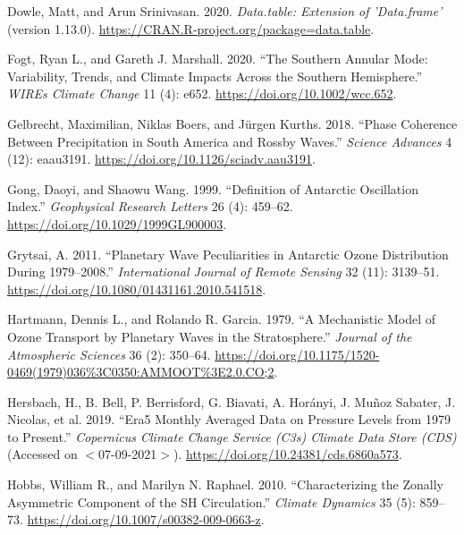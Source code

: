 \documentclass[smallextended]{svjour3}       %
\newlength{\cslhangindent}
\newlength{\cslentryspacingunit} %
\newenvironment{CSLReferences}[2] %
 {%
  \setlength{\parindent}{0pt}
  \ifodd #1
  \let\oldpar\par
  \def\par{\hangindent=\cslhangindent\oldpar}
  \fi
  \setlength{\parskip}{#2\cslentryspacingunit}
 }%
 {}
\begin{document}
\begin{CSLReferences}{1}{0}
\leavevmode{}%
Dowle, Matt, and Arun Srinivasan. 2020. \emph{Data.table: {Extension} of 'Data.frame'} (version 1.13.0). \url{https://CRAN.R-project.org/package=data.table}.

\leavevmode{}%
Fogt, Ryan L., and Gareth J. Marshall. 2020. {``The {Southern Annular Mode}: {Variability}, Trends, and Climate Impacts Across the {Southern Hemisphere}.''} \emph{WIREs Climate Change} 11 (4): e652. \url{https://doi.org/10.1002/wcc.652}.

\leavevmode{}%
Gelbrecht, Maximilian, Niklas Boers, and Jürgen Kurths. 2018. {``Phase Coherence Between Precipitation in {South America} and {Rossby} Waves.''} \emph{Science Advances} 4 (12): eaau3191. \url{https://doi.org/10.1126/sciadv.aau3191}.

\leavevmode{}%
Gong, Daoyi, and Shaowu Wang. 1999. {``Definition of {Antarctic Oscillation} Index.''} \emph{Geophysical Research Letters} 26 (4): 459--62. \url{https://doi.org/10.1029/1999GL900003}.

\leavevmode{}%
Grytsai, A. 2011. {``Planetary Wave Peculiarities in {Antarctic} Ozone Distribution During 1979--2008.''} \emph{International Journal of Remote Sensing} 32 (11): 3139--51. \url{https://doi.org/10.1080/01431161.2010.541518}.

\leavevmode{}%
Hartmann, Dennis L., and Rolando R. Garcia. 1979. {``A {Mechanistic Model} of {Ozone Transport} by {Planetary Waves} in the {Stratosphere}.''} \emph{Journal of the Atmospheric Sciences} 36 (2): 350--64. \url{https://doi.org/10.1175/1520-0469(1979)036\%3C0350:AMMOOT\%3E2.0.CO;2}.

\leavevmode{}%
Hersbach, H., B. Bell, P. Berrisford, G. Biavati, A. Horányi, J. Muñoz Sabater, J. Nicolas, et al. 2019. {``{Era5} Monthly Averaged Data on Pressure Levels from 1979 to Present.''} \emph{{Copernicus Climate Change Service} ({C3s}) {Climate Data Store} ({CDS})} (Accessed on {\(<\)}07-09-2021{\(>\)}). \url{https://doi.org/10.24381/cds.6860a573}.

\leavevmode{}%
Hobbs, William R., and Marilyn N. Raphael. 2010. {``Characterizing the Zonally Asymmetric Component of the {SH} Circulation.''} \emph{Climate Dynamics} 35 (5): 859--73. \url{https://doi.org/10.1007/s00382-009-0663-z}.


\end{CSLReferences}
\end{document}
